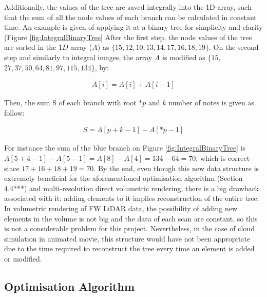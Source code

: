 \documentclass{subfiles}
\begin{document}
\par Additionally, the values of the tree are saved integrally into the 1D-array, such that the sum of all the node values of each branch can be calculated in constant time. An example is given of applying it at a binary tree for simplicity and clarity (Figure \ref{fig:IntegralBinaryTree} After the first step, the node values of the tree are sorted in the $1D$ array ($A$) as $\{15, 12, 10, 13, 14, 17, 16, 18, 19\}$. On the second step and similarly to integral images, the array $A$ is modified as $\{15,$ $27,37,50, 64, 81, 97, 115, 134\}$, by:

\begin{equation}
\begin{split}
A[i]=A[i]+A[i-1]
\end{split}
\end{equation}


\par Then, the sum S of each branch with root $*p$ and $k$ number of notes is given as follow:


\begin{equation}
\begin{split}
S = A[p+k-1]-A[*p-1]
\end{split}
\end{equation}

For instance the sum of the blue branch on Figure \ref{fig:IntegralBinaryTree} is $A[5+4-1]-A[5-1] = A[8]-A[4] = 134-64 = 70$, which is correct since $17+16+18+19=70$.
By the end, even though this new data structure is extremely beneficial for the aforementioned optimisation algorithm (Section 4.4***) and multi-resolution direct volumetric rendering, there is a big drawback associated with it: adding elements to it implies reconstruction of the entire tree. In volumetric rendering of FW LiDAR data, the possibility of adding new elements in the volume is not big and the data of each scan are constant, so this is not a considerable problem for this project. Nevertheless, in the case of cloud simulation in animated movie, this structure would have not been appropriate due to the time required to reconstruct the tree every time an element is added or modified. 






\subsection{Optimisation Algorithm}
\end{document}
